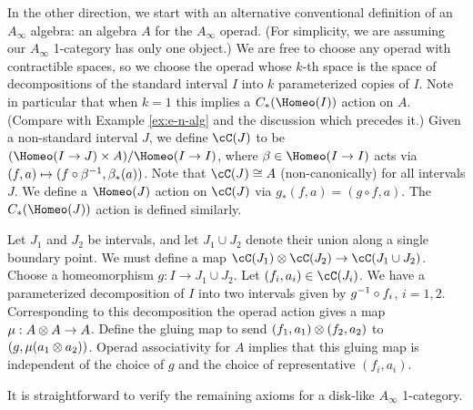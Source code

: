 \medskip

In the other direction, we start with an alternative conventional definition of an $A_\infty$ algebra:
an algebra $A$ for the $A_\infty$ operad.
(For simplicity, we are assuming our $A_\infty$ 1-category has only one object.)
We are free to choose any operad with contractible spaces, so we choose the operad
whose $k$-th space is the space of decompositions of the standard interval $I$ into $k$
parameterized copies of $I$.
Note in particular that when $k=1$ this implies a $C_*(\Homeo(I))$ action on $A$.
(Compare with Example \ref{ex:e-n-alg} and the discussion which precedes it.)
Given a non-standard interval $J$, we define $\cC(J)$ to be
$(\Homeo(I\to J) \times A)/\Homeo(I\to I)$,
where $\beta \in \Homeo(I\to I)$ acts via $(f, a) \mapsto (f\circ \beta^{-1}, \beta_*(a))$.
Note that $\cC(J) \cong A$ (non-canonically) for all intervals $J$.
We define a $\Homeo(J)$ action on $\cC(J)$ via $g_*(f, a) = (g\circ f, a)$.
The $C_*(\Homeo(J))$ action is defined similarly.

Let $J_1$ and $J_2$ be intervals, and let $J_1\cup J_2$ denote their union along a single boundary point.
We must define a map $\cC(J_1)\ot\cC(J_2)\to\cC(J_1\cup J_2)$.
Choose a homeomorphism $g:I\to J_1\cup J_2$.
Let $(f_i, a_i)\in \cC(J_i)$.
We have a parameterized decomposition of $I$ into two intervals given by
$g^{-1} \circ f_i$, $i=1,2$.
Corresponding to this decomposition the operad action gives a map $\mu: A\otimes A\to A$.
Define the gluing map to send $(f_1, a_1)\otimes (f_2, a_2)$ to $(g, \mu(a_1\otimes a_2))$.
Operad associativity for $A$ implies that this gluing map is independent of the choice of
$g$ and the choice of representative $(f_i, a_i)$.

It is straightforward to verify the remaining axioms for a disk-like $A_\infty$ 1-category.







